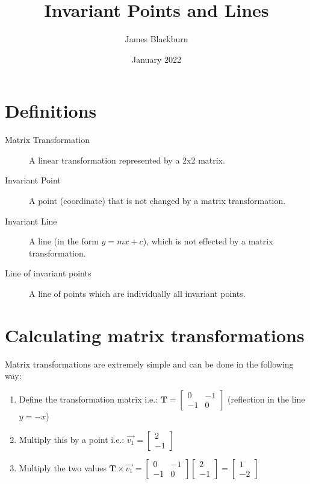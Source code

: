 \documentclass{article}[12pt]
\title{Invariant Points and Lines}
\author{James Blackburn}
\date{January 2022}
\begin{document}
\maketitle
\section{Definitions}
\begin{description}
\item[Matrix Transformation] A linear transformation represented by a 2x2 matrix.
\item[Invariant Point] A point (coordinate) that is not changed by a matrix transformation.
\item[Invariant Line] A line (in the form $y=mx+c$), which is not effected by a matrix transformation.
\item[Line of invariant points] A line of points which are individually all invariant points.
\end{description}

\section{Calculating matrix transformations}
Matrix transformations are extremely simple and can be done in the following way:
\begin{enumerate}
\item Define the transformation matrix i.e.:
 \(\boldsymbol{T} = \begin{bmatrix} 0 & -1 \\ -1 & 0\end{bmatrix}\) (reflection in the line $y=-x$)
\item Multiply this by a point i.e.: \(\vec{v_1} = \begin{bmatrix} 2 \\ -1\end{bmatrix}\)
\item Multiply the two values \(\boldsymbol{T} \times \vec{v_1} = \begin{bmatrix} 0 & -1 \\ -1 & 0\end{bmatrix}\begin{bmatrix} 2 \\ -1\end{bmatrix} = \begin{bmatrix} 1 \\ -2\end{bmatrix}\)
\end{enumerate}
\end{document}
